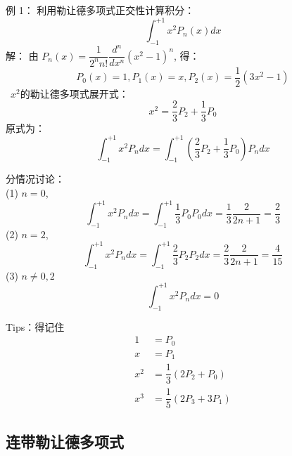 	{\alert{例 1：}}	利用勒让德多项式正交性计算积分：
	\begin{equation*}
		\int_{-1}^{+1} x^2 P _{n}(x) dx 
	\end{equation*}		
	{\alert{解：}} 由 $ P_{n}(x)=\dfrac{1}{2^{n} n !} \dfrac{d^{n}}{d x^{n}}\left(x^{2}-1\right)^{n} $, 得：
	\begin{equation*}
		P_0(x)=1, 	P_1(x)=x,  P_2(x)= \dfrac{1}{2}(3x^2-1)  
	\end{equation*}	
	 $x^2$的勒让德多项式展开式：
	$$ x^2 =\dfrac{2}{3}P_2+\dfrac{1}{3}P_0$$
	原式为：
	\begin{equation*}
			\int_{-1}^{+1} x^2 P _{n} dx = \int_{-1}^{+1} (\dfrac{2}{3}P_2+\dfrac{1}{3}P_0)  P _{n} dx 	
	\end{equation*}	
	


	分情况讨论：\\
	(1)  $n=0$, 
	\begin{equation*}
		\int_{-1}^{+1} x^2 P _{n} dx  =   \int_{-1}^{+1} \dfrac{1}{3}P_0  P _{0} dx=\dfrac{1}{3} \frac{2}{2n+1}  = \dfrac{2}{3}	
	\end{equation*}	
	(2)  $n=2$, 
	\begin{equation*}
		\int_{-1}^{+1} x^2 P _{n} dx  =   \int_{-1}^{+1} \dfrac{2}{3}P_2  P _{2} dx= \dfrac{2}{3}\frac{2}{2n+1}  = \dfrac{4}{15}	
	\end{equation*}	
	(3) $ n\neq 0,2$
	\begin{equation*}
		\int_{-1}^{+1} x^2 P _{n} dx  =  0	
	\end{equation*}
	


	{Tips：得记住}	
	\begin{equation*}
		\begin{split}
		1&= P_0 \\
		x&=P_1\\
	    x^2&=\dfrac{1}{3}(2P_2+P_0)\\
		x^3&=\dfrac{1}{5}(2P_3+3P_1)		
		\end{split}
	\end{equation*}
	

\subsection{连带勒让德多项式}


